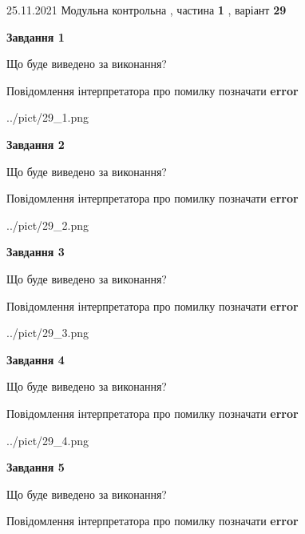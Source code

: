 \documentclass[10pt, ukrainian]{article}
\begin{document}
{25.11.2021 Модульна контрольна , частина \textbf { 1 }, варіант  \No \textbf { 29 }\par}
{
\begin {large}

{\begin {center}\textbf{Завдання 1}\end {center}}\par
Що буде виведено за виконання? \par
Повідомлення інтерпретатора про помилку позначати \textbf{error}

\begin{center}
	{../pict/29_1.png}
\end{center}
\newpage

{\begin {center}\textbf{Завдання 2}\end {center}}\par
Що буде виведено за виконання? \par
Повідомлення інтерпретатора про помилку позначати \textbf{error}

\begin{center}
	{../pict/29_2.png}
\end{center}
\newpage

{\begin {center}\textbf{Завдання 3}\end {center}}\par
Що буде виведено за виконання? \par
Повідомлення інтерпретатора про помилку позначати \textbf{error}

\begin{center}
	{../pict/29_3.png}
\end{center}
\newpage

{\begin {center}\textbf{Завдання 4}\end {center}}\par
Що буде виведено за виконання? \par
Повідомлення інтерпретатора про помилку позначати \textbf{error}

\begin{center}
	{../pict/29_4.png}
\end{center}
\newpage

{\begin {center}\textbf{Завдання 5}\end {center}}\par
Що буде виведено за виконання? \par
Повідомлення інтерпретатора про помилку позначати \textbf{error}


\end{large}}
\end{document}

